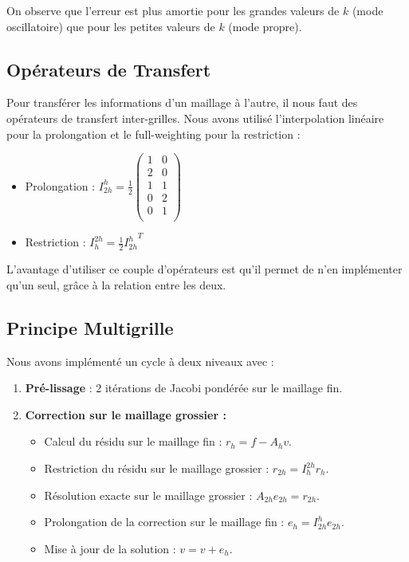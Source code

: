 \documentclass[12pt,a4paper]{article}
\begin{document}
On observe que l'erreur est plus amortie pour les grandes valeurs de $k$ (mode oscillatoire) que pour les petites valeurs de $k$ (mode propre).


\subsection{Opérateurs de Transfert}
Pour transférer les informations d’un maillage à l’autre, il nous faut des opérateurs de transfert inter-grilles.
Nous avons utilisé l’interpolation linéaire pour la prolongation et le full-weighting pour la restriction :
\begin{itemize}
    \item Prolongation : $I_{2h}^h = \frac{1}{2}
    \begin{pmatrix}
    1 & 0 \\
    2 & 0 \\
    1 & 1 \\
    0 & 2 \\
    0 & 1 \\
    \end{pmatrix}$
    
    \item Restriction : $I_{h}^{2h} = \frac{1}{2} {I_{2h}^h}^T$
\end{itemize}

L'avantage d'utiliser ce couple d'opérateurs est qu'il permet de n'en implémenter qu'un seul, grâce à la relation entre les deux.

\subsection{Principe Multigrille}

Nous avons implémenté un cycle à deux niveaux avec :
\begin{enumerate}
    \item \textbf{Pré-lissage} : 2 itérations de Jacobi pondérée sur le maillage fin.
    \item \textbf{Correction sur le maillage grossier :}
    \begin{itemize}
        \item Calcul du résidu sur le maillage fin : $r_h = f - A_h v$.
        \item Restriction du résidu sur le maillage grossier : $r_{2h} = I_{h}^{2h} r_h$.
        \item Résolution exacte sur le maillage grossier : $A_{2h} e_{2h} = r_{2h}$.
        \item Prolongation de la correction sur le maillage fin : $e_h = I_{2h}^h e_{2h}$.
        \item Mise à jour de la solution : $v = v + e_h$. \\
    \end{itemize}
\end{enumerate}
\end{document}
